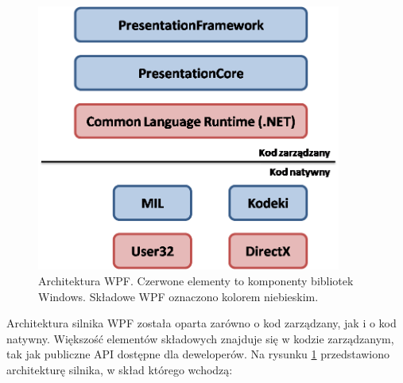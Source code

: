 \begin{figure}[h]
	\includegraphics[width=10cm]{WpfArchitecture}
	\centering
	\caption{Architektura WPF. Czerwone elementy to komponenty bibliotek Windows. Składowe WPF oznaczono kolorem niebieskim.}
	\label{im: WpfArchitecture}
\end{figure} 

Architektura silnika WPF została oparta zarówno o kod zarządzany, jak i o kod natywny.  Większość elementów składowych znajduje się w kodzie zarządzanym, tak jak publiczne API dostępne dla deweloperów. Na rysunku \ref{im: WpfArchitecture} przedstawiono architekturę silnika, w skład którego wchodzą:

